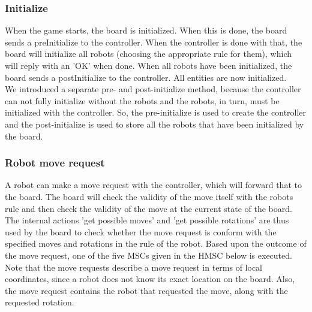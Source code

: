 	\subsubsection{Initialize}
	\begin{minipage}{\linewidth}
		When the game starts, the board is initialized. When this is done, the board sends a preInitialize to the controller. When the controller is done with that, the board will initialize all robots (choosing the appropriate rule for them), which will reply with an 'OK' when done. When all robots have been initialized, the board sends a postInitialize to the controller. All entities are now initialized. \\
	We introduced a separate pre- and post-initialize method, because the controller can not fully initialize without the robots and the robots, in turn, must be initialized with the controller. So, the pre-initialize is used to create the controller and the post-initialize is used to store all the robots that have been initialized by the board.

		
    \end{minipage}

	\subsubsection{Robot move request}
	\begin{minipage}{\linewidth}
		A robot can make a move request with the controller, which will forward that to the board. The board will check the validity of the move itself with the robots rule and then check the validity of the move at the current state of the board. The internal actions 'get possible moves' and 'get possible rotations' are thus used by the board to check whether the move request is conform with the specified moves and rotations in the rule of the robot. Based upon the outcome of the move request, one of the five MSCs given in the HMSC below is executed. \\
Note that the move requests describe a move request in terms of local coordinates, since a robot does not know its exact location on the board. Also, the move request contains the robot that requested the move, along with the requested rotation.

		
    \end{minipage}

